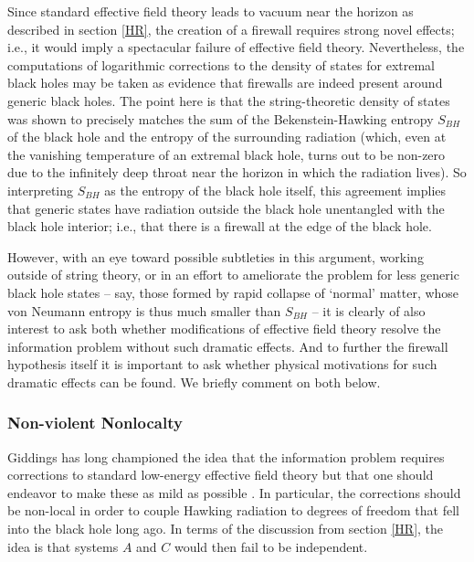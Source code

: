 \documentclass[10pt]{article}
\begin{document}
Since standard effective field theory leads to vacuum near the horizon as described in section \ref{HR}, the creation of a firewall requires strong novel effects; i.e., it would imply a spectacular failure of effective field theory.  Nevertheless, the computations \cite{Banerjee:2011jp,Sen:2011ba,Sen:2012cj,Bhattacharyya:2012ye} of logarithmic corrections to the density of states for extremal black holes may be taken as evidence that firewalls are indeed present around generic black holes.  The point here is that the string-theoretic density of states was shown to precisely matches the sum of the Bekenstein-Hawking entropy $S_{BH}$ of the black hole and the entropy of the surrounding radiation (which, even at the vanishing temperature of an extremal black hole, turns out to be non-zero due to the infinitely deep throat near the horizon in which the radiation lives).  So interpreting $S_{BH}$ as the entropy of the black hole itself, this agreement implies that generic states have radiation outside the black hole unentangled with the black hole interior; i.e., that there is a firewall at the edge of the black hole.


However, with an eye toward possible subtleties in this argument, working outside of string theory, or in an effort to ameliorate the problem for less generic black hole states -- say, those formed by rapid collapse of `normal' matter, whose von Neumann entropy is thus much smaller than $S_{BH}$ --
 it is clearly of also interest to ask both whether modifications of effective field theory resolve the information problem without such dramatic effects.  And to further the firewall hypothesis itself it is important to ask whether physical motivations for such dramatic effects can be found.  We briefly comment on both below.

\subsubsection{Non-violent Nonlocalty}
\label{NVNL}

Giddings has long championed the idea that the information problem requires corrections to standard low-energy effective field theory but that one should endeavor to make these as mild as possible \cite{Giddings:2011ks,Giddings:2012gc,Giddings:2013kcj}.  In particular, the corrections should be non-local in order to couple Hawking radiation to degrees of freedom that fell into the black hole long ago.  In terms of the discussion from section \ref{HR}, the idea is that systems $A$ and $C$ would then fail to be independent.
\end{document}
